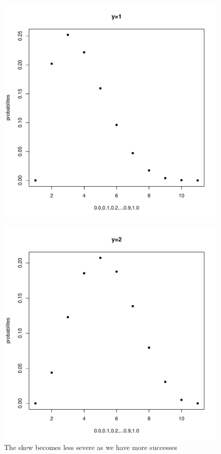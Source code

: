 \documentclass[11pt]{article}
\begin{document}
\begin{enumerate}
\begin{enumerate}
\begin{figure}[H]
		\includegraphics[scale=.6]{y=1graph.pdf}
	\end{figure}
	\begin{figure}[H]
		\centering
		\caption{The skew becomes less severe as we have more successes}
		\includegraphics[scale=.6]{y=2graph.pdf}

\end{figure}
\end{enumerate}
\end{enumerate}
\end{document}
